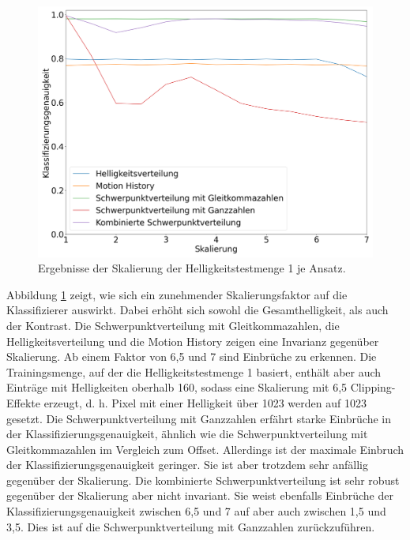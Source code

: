 \begin{figure}[h!]
    \centering
    \includegraphics[width=\linewidth]{images/brightness_scaling.png}
    \caption{Ergebnisse der Skalierung der Helligkeitstestmenge 1 je Ansatz.}
    \label{fig:brightness_scaling}
\end{figure}
\newline
\newline
Abbildung \ref{fig:brightness_scaling} zeigt, wie sich ein zunehmender Skalierungsfaktor auf die Klassifizierer auswirkt. Dabei erhöht sich sowohl die Gesamthelligkeit, als auch der Kontrast. Die Schwerpunktverteilung mit
Gleitkommazahlen, die Helligkeitsverteilung und die Motion History zeigen eine Invarianz gegenüber Skalierung. Ab einem Faktor von 6,5 und 7 sind Einbrüche zu erkennen. Die Trainingsmenge, auf der die
Helligkeitstestmenge 1 basiert, enthält aber auch Einträge mit Helligkeiten oberhalb 160, sodass eine Skalierung mit 6,5 Clipping-Effekte erzeugt, d. h. Pixel mit einer Helligkeit
über 1023 werden auf 1023 gesetzt. Die Schwerpunktverteilung mit Ganzzahlen erfährt starke Einbrüche in der Klassifizierungsgenauigkeit, ähnlich wie die Schwerpunktverteilung mit Gleitkommazahlen im
Vergleich zum Offset. Allerdings ist der maximale Einbruch der Klassifizierungsgenauigkeit geringer. Sie ist aber trotzdem sehr anfällig gegenüber der Skalierung. Die kombinierte Schwerpunktverteilung
ist sehr robust gegenüber der Skalierung aber nicht invariant. Sie weist ebenfalls Einbrüche der Klassifizierungsgenauigkeit zwischen 6,5 und 7 auf aber auch zwischen 1,5 und 3,5. Dies ist
auf die Schwerpunktverteilung mit Ganzzahlen zurückzuführen.
